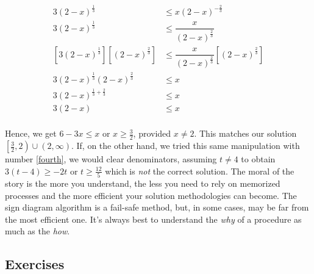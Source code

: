 \begin{align*}
3 (2-x)^{\frac{1}{3}} & \leq x (2-x)^{-\frac{2}{3}} \\
3 (2-x)^{\frac{1}{3}} & \leq \dfrac{x}{(2-x)^{\frac{2}{3}}} \\
\left[3 (2-x)^{\frac{1}{3}} \right] \left[  (2-x)^{\frac{2}{3}}\right]& \leq \dfrac{x}{(2-x)^{\frac{2}{3}}}  \left[  (2-x)^{\frac{2}{3}}\right] \tag{provided $x \neq 2$} \\
3 (2-x)^{\frac{1}{3}} (2-x)^{\frac{2}{3}} & \leq x \\
3 (2-x)^{\frac{1}{3}+\frac{2}{3}} & \leq x \\
3(2-x) & \leq x  \\
\end{align*}

Hence, we get $6-3x \leq x$ or $x \geq \frac{3}{2}$, provided $x \neq 2$. This matches our solution $\left[\frac{3}{2},2\right) \cup (2, \infty)$.  If, on the other hand, we tried this same manipulation with number \ref{fourth}, we would clear denominators, assuming $t \neq 4$ to obtain $3(t-4) \geq -2t$ or $t \geq \frac{12}{5}$ which is \textit{not} the correct solution.  The moral of the story is the more you understand, the less you need to rely on memorized processes and the more efficient your solution methodologies can become.  The sign diagram algorithm is a fail-safe method, but, in some cases, may be far from the most efficient one.  It's always best to understand the \textit{why} of a procedure as much as the \textit{how}.  

\clearpage

\subsection{Exercises}



\closegraphsfile